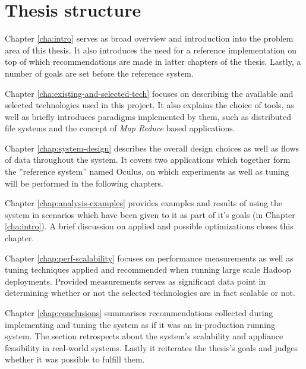 \section{Thesis structure}
Chapter \ref{cha:intro} serves as broad overview and introduction into the problem area of this thesis. It also introduces the need for a reference implementation on top of which recommendations are made in latter chapters of the thesis. Lastly, a number of goals are set before the reference system.

Chapter \ref{cha:existing-and-selected-tech} focuses on describing the available and selected technologies used in this project. It also explains the choice of tools, as well as briefly introduces paradigms implemented by them, such as distributed file systems and the concept of \textit{Map Reduce} \cite{map-reduce} based applications.

Chapter \ref{chap:system-design} describes the overall design choices as well as flows of data throughout the system. It covers two applications which together form the ''reference system'' named Oculus, on which experiments as well as tuning will be performed in the following chapters.

Chapter \ref{chap:analysis-examples} provides examples and results of using the system in scenarios which have been given to it as part of it's goals (in Chapter \ref{cha:intro}). A brief discussion on applied and possible optimizations closes this chapter.

Chapter \ref{chap:perf-scalability} focuses on performance measurements as well as tuning techniques applied and recommended when running large scale Hadoop deployments. Provided measurements serves as significant data point in determining whether or not the selected technologies are in fact scalable or not.

Chapter \ref{chap:conclusions} summarises recommendations collected during implementing and tuning the system as if it was an in-production running system. The section retrospects about the system's scalability and appliance feasibility in real-world systems. Lastly it reiterates the thesis's goals and judges whether it was possible to fulfill them.






